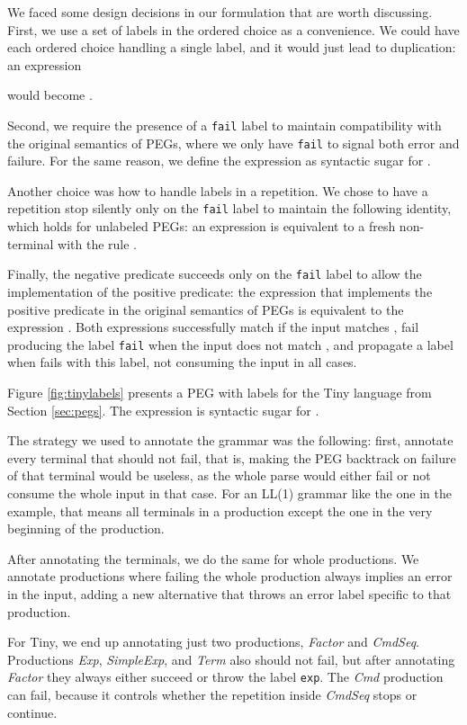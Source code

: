 \documentclass[3p,12pt,singlecolumn]{elsarticle}
\begin{document}
We faced some design decisions in our formulation that are worth
discussing. First, we use a set of labels in the ordered choice as
a convenience. We could have each ordered choice handling a single label,
and it would just lead to duplication:
an expression

would become
.

Second, we require the presence of a \texttt{fail} label
to maintain compatibility with the original semantics of PEGs,
where we only have \texttt{fail} to signal both error and failure.
For the same reason, we define the expression  as
syntactic sugar for .

Another choice was how to handle labels in a repetition.
We chose to have a repetition stop silently only on the
\texttt{fail}
label to maintain the following identity, which holds
for unlabeled PEGs: an expression 
is equivalent to a fresh non-terminal  with the rule
.

Finally, the negative predicate succeeds only on the
 \texttt{fail} label to
allow the implementation of the positive predicate: the
 expression
 that implements the positive predicate in the original semantics
of PEGs \cite{ford2002packrat,ford2002pappy,ford2004peg}
is equivalent to the expression .
Both expressions successfully match if the input matches ,
fail producing the label \texttt{fail} when the input does
not match , and propagate a label  when  fails
with this label, not consuming the input in all cases.

Figure \ref{fig:tinylabels} presents a PEG with labels for the Tiny
language from Section \ref{sec:pegs}. 
The expression  is syntactic
sugar for . 

The strategy we used to annotate the grammar was the following:
first, annotate every terminal that should not fail, that is,
making the PEG backtrack on failure of that terminal would
be useless, as the whole parse would either fail or not consume
the whole input in that case. For an LL(1) grammar like the
one in the example, that means all terminals in a production except
the one in the very beginning of the production.

After annotating the terminals, we do the same for whole productions.
We annotate productions where failing the whole production 
always implies an error in the input, adding a new alternative that
throws an error label specific to that production.

For Tiny,
we end up annotating just two productions, {\em Factor} and {\em CmdSeq}.
Productions {\em Exp}, {\em SimpleExp}, and {\em Term} also
should not fail, but after annotating {\em Factor} they always
either succeed or throw the label {\tt exp}. The {\it Cmd}
production can fail, because it controls whether the repetition inside
{\it CmdSeq} stops or continue.
\end{document}
